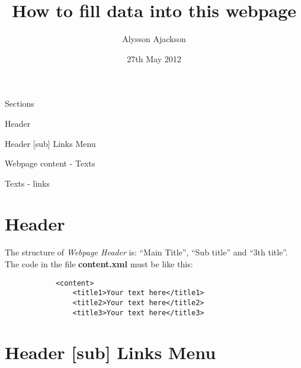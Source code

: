 \documentclass{article}
\title{How to fill data into this webpage}
\author{Alysson Ajackson}
\date{27th May 2012}
\begin{document}
        \maketitle


    Sections
    \begin{center}
        \begin{list}{Section :~}{}
        \item Header
        \item Header [sub] Links Menu
        \item Webpage content - Texts
        \item Texts - links
        \end{list}
    \end{center}

    \vspace{10pt}

    \section {Header}
            The structure of \emph{Webpage Header} is: ``Main Title'', ``Sub title'' and ``3th title''.
            The code in the file \textbf{content.xml} must be like this:


            \begin{verbatim}
            <content>
                <title1>Your text here</title1>
                <title2>Your text here</title2>
                <title3>Your text here</title3>
            \end{verbatim}

    \section {Header [sub] Links Menu}
\end{document}

